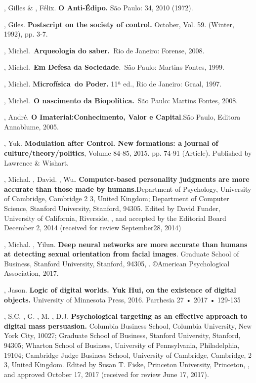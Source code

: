 , Gilles \& , Félix. \textbf{O Anti-Édipo.} São Paulo:
34, 2010 (1972).

, Giles. \textbf{Postscript on the society of control.} October,
Vol. 59. (Winter, 1992), pp. 3-7.

, Michel.~\textbf{Arqueologia do saber.}~Rio de Janeiro:
Forense, 2008.

, Michel.~\textbf{Em Defesa da Sociedade}.~São Paulo: Martins
Fontes, 1999.

, Michel\emph{.} \textbf{Microfísica~do Poder.} 11ª ed., Rio de
Janeiro: Graal, 1997.~

, Michel.~\textbf{O nascimento da Biopolítica.}~São Paulo:
Martins Fontes, 2008.

, André. \textbf{O Imaterial:Conhecimento, Valor e Capital}.São
Paulo, Editora Annablume, 2005.

, Yuk. \textbf{Modulation after Control. New formations: a journal of
culture/theory/politics}, Volume 84-85, 2015. pp. 74-91 (Article).
Published by Lawrence \& Wishart.

, Michal. , David. , Wu\textbf{. Computer-based
personality judgments are more accurate than those made by
humans.}Department of Psychology, University of Cambridge, Cambridge 2
3, United Kingdom; Department of Computer Science, Stanford
University, Stanford,  94305. Edited by David Funder, University of
California, Riverside, , and accepted by the Editorial Board December
2, 2014 (received for review September28, 2014)

, Michal. , Yilun. \textbf{Deep neural networks are more
accurate than humans at detecting sexual orientation from facial
images}\emph{.} Graduate School of Business, Stanford University,
Stanford, 94305, . ©American Psychological Association, 2017.

, Jason. \textbf{Logic of digital worlds. Yuk Hui, on the
existence of digital objects.} University of Minnesota Press, 2016.
Parrhesia 27 • 2017 • 129-135

, S.C. , G. , M. , D.J. \textbf{Psychological
targeting as an effective approach to digital mass persuasion.} Columbia
Business School, Columbia University, New York City,  10027; Graduate
School of Business, Stanford University, Stanford,  94305; Wharton
School of Business, University of Pennsylvania, Philadelphia,  19104;
Cambridge Judge Business School, University of Cambridge, Cambridge, 2
3, United Kingdom. Edited by Susan T. Fiske, Princeton University,
Princeton, , and approved October 17, 2017 (received for review June
17, 2017).

